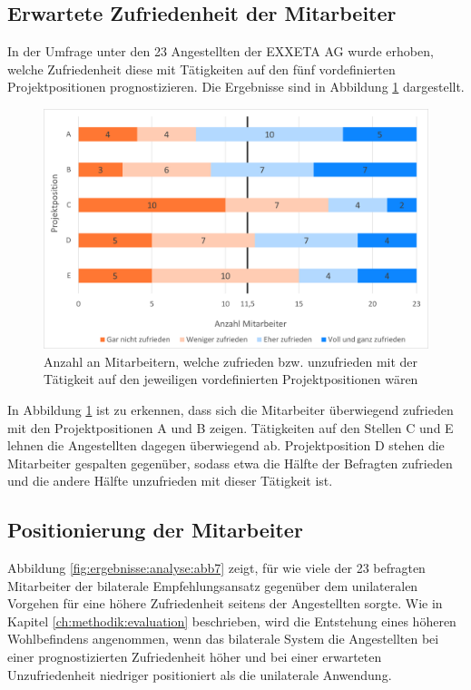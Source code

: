 \subsection{Erwartete Zufriedenheit der Mitarbeiter}
\label{ch:ergebnisse:fallstudie:umfrageMitarbeiter}
In der Umfrage unter den 23 Angestellten der EXXETA AG wurde erhoben, welche Zufriedenheit diese mit Tätigkeiten auf den fünf vordefinierten Projektpositionen prognostizieren. Die Ergebnisse sind in Abbildung \ref{fig:ergebnisse:fallstudie:abb1} dargestellt.

\begin{figure}[h]
	\centering
	\includegraphics[width=1\textwidth]{gfx/mitarbeiter-zufriedenheit-umfrage.png}
	\caption{Anzahl an Mitarbeitern, welche zufrieden bzw. unzufrieden mit der Tätigkeit auf den jeweiligen vordefinierten Projektpositionen wären}
	\label{fig:ergebnisse:fallstudie:abb1}
\end{figure}

In Abbildung \ref{fig:ergebnisse:fallstudie:abb1} ist zu erkennen, dass sich die Mitarbeiter überwiegend zufrieden mit den Projektpositionen A und B zeigen. Tätigkeiten auf den Stellen C und E lehnen die Angestellten dagegen überwiegend ab. Projektposition D stehen die Mitarbeiter gespalten gegenüber, sodass etwa die Hälfte der Befragten zufrieden und die andere Hälfte unzufrieden mit dieser Tätigkeit ist.
\newpage
\subsection{Positionierung der Mitarbeiter}
\label{ch:ergebnisse:fallstudie:positionierungMitarbeiter}
Abbildung \ref{fig:ergebnisse:analyse:abb7} zeigt, für wie viele der 23 befragten Mitarbeiter der bilaterale Empfehlungsansatz gegenüber dem unilateralen Vorgehen für eine höhere Zufriedenheit seitens der Angestellten sorgte. Wie in Kapitel \ref{ch:methodik:evaluation} beschrieben, wird die Entstehung eines höheren Wohlbefindens angenommen, wenn das bilaterale System die Angestellten bei einer prognostizierten Zufriedenheit höher und bei einer erwarteten Unzufriedenheit niedriger positioniert als die unilaterale Anwendung.

